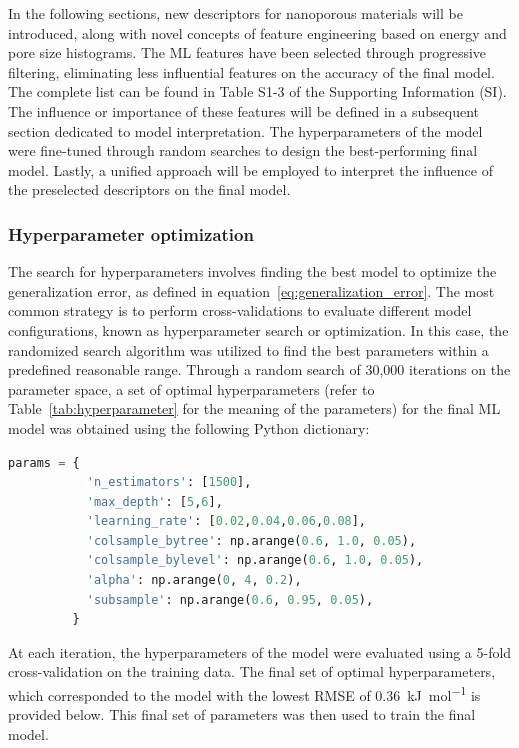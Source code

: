 \documentclass[main]{subfiles}
\begin{document}
In the following sections, new descriptors for nanoporous materials will be introduced, along with novel concepts of feature engineering based on energy and pore size histograms. The ML features have been selected through progressive filtering, eliminating less influential features on the accuracy of the final model. The complete list can be found in Table S1-3 of the Supporting Information (SI). The influence or importance of these features will be defined in a subsequent section dedicated to model interpretation. The hyperparameters of the model were fine-tuned through random searches to design the best-performing final model. Lastly, a unified approach will be employed to interpret the influence of the preselected descriptors on the final model.

\subsubsection{Hyperparameter optimization}\label{sct:hyperparameter}

The search for hyperparameters involves finding the best model to optimize the generalization error, as defined in equation~\ref{eq:generalization_error}. The most common strategy is to perform cross-validations to evaluate different model configurations, known as hyperparameter search or optimization. In this case, the randomized search algorithm was utilized to find the best parameters within a predefined reasonable range. Through a random search of 30,000 iterations on the parameter space, a set of optimal hyperparameters (refer to Table~\ref{tab:hyperparameter} for the meaning of the parameters) for the final ML model was obtained using the following Python dictionary:

\begin{lstlisting}[language=Python]
params = {
           'n_estimators': [1500],
           'max_depth': [5,6],
           'learning_rate': [0.02,0.04,0.06,0.08],
           'colsample_bytree': np.arange(0.6, 1.0, 0.05),
           'colsample_bylevel': np.arange(0.6, 1.0, 0.05),
           'alpha': np.arange(0, 4, 0.2),
           'subsample': np.arange(0.6, 0.95, 0.05),
         }
\end{lstlisting}

At each iteration, the hyperparameters of the model were evaluated using a 5-fold cross-validation on the training data. The final set of optimal hyperparameters, which corresponded to the model with the lowest RMSE of \SI{0.36}{\kilo\joule\per\mole} is provided below. This final set of parameters was then used to train the final model.
\end{document}
